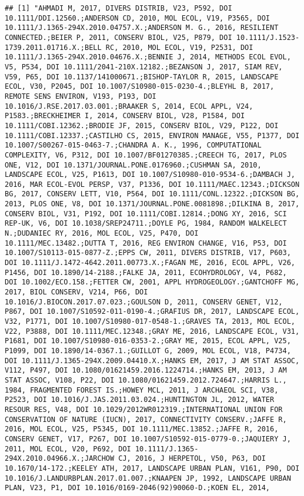 \documentclass[]{article}
\begin{document}
\begin{verbatim}
## [1] "AHMADI M, 2017, DIVERS DISTRIB, V23, P592, DOI 10.1111/DDI.12560.;ANDERSON CD, 2010, MOL ECOL, V19, P3565, DOI 10.1111/J.1365-294X.2010.04757.X.;ANDERSON M. G., 2016, RESILIENT CONNECTED.;BEIER P, 2011, CONSERV BIOL, V25, P879, DOI 10.1111/J.1523-1739.2011.01716.X.;BELL RC, 2010, MOL ECOL, V19, P2531, DOI 10.1111/J.1365-294X.2010.04676.X.;BENNIE J, 2014, METHODS ECOL EVOL, V5, P534, DOI 10.1111/2041-210X.12182.;BEZANSON J, 2017, SIAM REV, V59, P65, DOI 10.1137/141000671.;BISHOP-TAYLOR R, 2015, LANDSCAPE ECOL, V30, P2045, DOI 10.1007/S10980-015-0230-4.;BLEYHL B, 2017, REMOTE SENS ENVIRON, V193, P193, DOI 10.1016/J.RSE.2017.03.001.;BRAAKER S, 2014, ECOL APPL, V24, P1583.;BRECKHEIMER I, 2014, CONSERV BIOL, V28, P1584, DOI 10.1111/COBI.12362.;BRODIE JF, 2015, CONSERV BIOL, V29, P122, DOI 10.1111/COBI.12337.;CASTILHO CS, 2015, ENVIRON MANAGE, V55, P1377, DOI 10.1007/S00267-015-0463-7.;CHANDRA A. K., 1996, COMPUTATIONAL COMPLEXITY, V6, P312, DOI 10.1007/BF01270385.;CREECH TG, 2017, PLOS ONE, V12, DOI 10.1371/JOURNAL.PONE.0176960.;CUSHMAN SA, 2010, LANDSCAPE ECOL, V25, P1613, DOI 10.1007/S10980-010-9534-6.;DAMBACH J, 2016, MAR ECOL-EVOL PERSP, V37, P1336, DOI 10.1111/MAEC.12343.;DICKSON BG, 2017, CONSERV LETT, V10, P564, DOI 10.1111/CONL.12322.;DICKSON BG, 2013, PLOS ONE, V8, DOI 10.1371/JOURNAL.PONE.0081898.;DILKINA B, 2017, CONSERV BIOL, V31, P192, DOI 10.1111/COBI.12814.;DONG XY, 2016, SCI REP-UK, V6, DOI 10.1038/SREP24711.;DOYLE PG, 1984, RANDOM WALKELECT N.;DUDANIEC RY, 2016, MOL ECOL, V25, P470, DOI 10.1111/MEC.13482.;DUTTA T, 2016, REG ENVIRON CHANGE, V16, P53, DOI 10.1007/S10113-015-0877-Z.;EPPS CW, 2011, DIVERS DISTRIB, V17, P603, DOI 10.1111/J.1472-4642.2011.00773.X.;FAGAN ME, 2016, ECOL APPL, V26, P1456, DOI 10.1890/14-2188.;FALKE JA, 2011, ECOHYDROLOGY, V4, P682, DOI 10.1002/ECO.158.;FETTER CW, 2001, APPL HYDROGEOLOGY.;GANTCHOFF MG, 2017, BIOL CONSERV, V214, P66, DOI 10.1016/J.BIOCON.2017.07.023.;GOULSON D, 2011, CONSERV GENET, V12, P867, DOI 10.1007/S10592-011-0190-4.;GRAFIUS DR, 2017, LANDSCAPE ECOL, V32, P1771, DOI 10.1007/S10980-017-0548-1.;GRAVES TA, 2013, MOL ECOL, V22, P3888, DOI 10.1111/MEC.12348.;GRAY ME, 2016, LANDSCAPE ECOL, V31, P1681, DOI 10.1007/S10980-016-0353-2.;GRAY ME, 2015, ECOL APPL, V25, P1099, DOI 10.1890/14-0367.1.;GUILLOT G, 2009, MOL ECOL, V18, P4734, DOI 10.1111/J.1365-294X.2009.04410.X.;HANKS EM, 2017, J AM STAT ASSOC, V112, P497, DOI 10.1080/01621459.2016.1224714.;HANKS EM, 2013, J AM STAT ASSOC, V108, P22, DOI 10.1080/01621459.2012.724647.;HARRIS L., 1984, FRAGMENTED FOREST IS.;HOWEY MCL, 2011, J ARCHAEOL SCI, V38, P2523, DOI 10.1016/J.JAS.2011.03.024.;HUNTINGTON JL, 2012, WATER RESOUR RES, V48, DOI 10.1029/2012WR012319.;INTERNATIONAL UNION FOR CONSERVATION OF NATURE (IUCN), 2017, CONNECTIVITY CONSERV.;JAFFE R, 2016, MOL ECOL, V25, P5345, DOI 10.1111/MEC.13852.;JAFFE R, 2016, CONSERV GENET, V17, P267, DOI 10.1007/S10592-015-0779-0.;JAQUIERY J, 2011, MOL ECOL, V20, P692, DOI 10.1111/J.1365-294X.2010.04966.X.;JARCHOW CJ, 2016, J HERPETOL, V50, P63, DOI 10.1670/14-172.;KEELEY ATH, 2017, LANDSCAPE URBAN PLAN, V161, P90, DOI 10.1016/J.LANDURBPLAN.2017.01.007.;KNAAPEN JP, 1992, LANDSCAPE URBAN PLAN, V23, P1, DOI 10.1016/0169-2046(92)90060-D.;KOEN EL, 2014, 
\end{verbatim}
\end{document}
